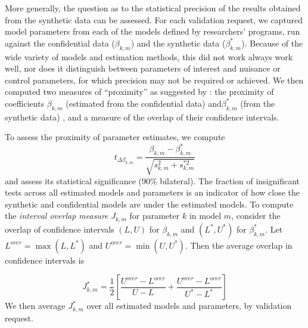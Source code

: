 %
%
%

More generally, the question as to the statistical precision of the results obtained from the synthetic data can be assessed. For each validation request, we captured model parameters from each of the models defined by researchers' programs, run against the confidential data ($\beta_{k,m}$) and the synthetic data ($\beta_{k,m}^*$). Because of the wide variety of models and estimation methods, this did not work always work well, nor does it distinguish between parameters of interest and nuisance or control parameters, for which precision may not be required or achieved. We then computed two measures of ``proximity''  as suggested by \cite{tas2006}: the proximity of  coefficients $\beta_{k,m}$ (estimated from the confidential data) and$\beta_{k,m}^*$ (from the synthetic data) , and a measure of the overlap of their confidence intervals.

To assess the proximity of parameter estimates, we compute
$$
t_{\Delta \beta_{k,m}} = \frac{\beta_{k,m} - \beta_{k,m}^*}{\sqrt{s_{k,m}^2 + s_{k,m}^{*2}}}
$$
and assess its statistical significance (90\% bilateral). The fraction of insignificant tests across all estimated models and parameters is an indicator of how close the synthetic and confidential models are under the estimated models.
%
To compute  the \emph{interval 
	overlap measure} $J_{k,m}$ for parameter $k$ in model $m$, consider the overlap of confidence intervals $(L,U)$ for $\beta_{k,m}$  and $(L^{*},U^{*})$ for $\beta_{k,m}^*$. Let $L^{over} = \max (L,L^{*} )$ and $U^{over} = \min (U,U^{*})$. Then the average overlap in confidence intervals is

$$
J_{k,m}^{*} = \frac{1}{2} \left [ \frac{U^{over} - L^{over}}{U-L} + \frac{U^{over} - L^{over}}{U^*-L ^*}        \right ]
$$
We then average $J_{k,m}^{*}$ over all estimated models and parameters, by validation request. 




